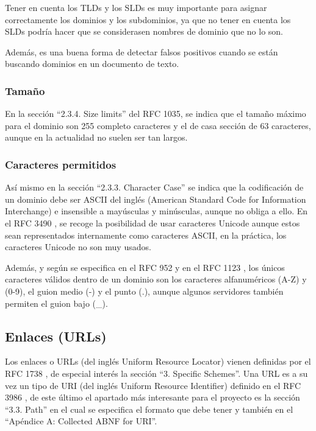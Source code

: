 Tener en cuenta los TLDs y los SLDs es muy importante para asignar correctamente los dominios y los subdominios, ya que no tener en cuenta los SLDs podría hacer que se considerasen nombres de dominio que no lo son. 

Además, es una buena forma de detectar falsos positivos cuando se están buscando dominios en un documento de texto.

\subsubsection{Tamaño}
En la sección “2.3.4. Size limits” del RFC 1035, se indica que el tamaño máximo para el dominio son 255 completo caracteres y el de casa sección de 63 caracteres, aunque en la actualidad no suelen ser tan largos. 

\subsubsection{Caracteres permitidos} \label{subsec:caracteres_permitiros_dominios}
Así mismo en la sección “2.3.3. Character Case” se indica que la codificación de un dominio debe ser ASCII del inglés (American Standard Code for Information Interchange) e insensible a mayúsculas y minúsculas, aunque no obliga a ello. En el RFC 3490 \cite{rfc3490}, se recoge la posibilidad de usar caracteres Unicode aunque estos sean representados internamente como caracteres ASCII, en la práctica, los caracteres Unicode no son muy usados.

Además, y según se especifica en el RFC 952 \cite{rfc952} y en el RFC 1123 \cite{rfc1123}, los únicos caracteres válidos dentro de un dominio son los caracteres alfanuméricos (A-Z) y (0-9), el guion medio (-) y el punto (.), aunque algunos servidores también permiten el guion bajo (\_).

\subsection{Enlaces (URLs)} \label{subsec:Enlaces}
Los enlaces o URLs (del inglés Uniform Resource Locator) vienen definidas por el RFC 1738 \cite{rfc1738}, de especial interés la sección “3. Specific Schemes”. Una URL es a su vez un tipo de URI (del inglés Uniform Resource Identifier) definido en el RFC 3986 \cite{rfc3986}, de este último el apartado más interesante para el proyecto es la sección “3.3.  Path” en el cual se especifica el formato que debe tener y también en el “Apéndice A: Collected ABNF for URI”.

